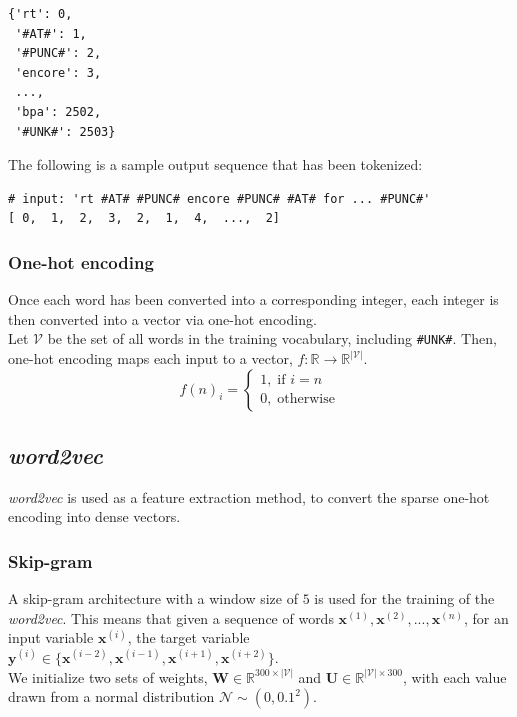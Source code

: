 \documentclass{article}
\begin{document}
\begin{verbatim}
{'rt': 0,
 '#AT#': 1,
 '#PUNC#': 2,
 'encore': 3,
 ...,
 'bpa': 2502,
 '#UNK#': 2503}
\end{verbatim}

The following is a sample output sequence that has been tokenized:
\begin{verbatim}
# input: 'rt #AT# #PUNC# encore #PUNC# #AT# for ... #PUNC#'
[ 0,  1,  2,  3,  2,  1,  4,  ...,  2]
\end{verbatim}

\subsubsection{One-hot encoding}
Once each word has been converted into a corresponding integer, each integer is then converted into a vector via one-hot encoding.\\

Let $\mathcal{V}$ be the set of all words in the training vocabulary, including \lstinline{#UNK#}. Then, one-hot encoding maps each input to a vector, $f: \mathbb{R} \rightarrow \mathbb{R}^{|\mathcal{V}|}$.
	$$ f(n)_i = \left\{\begin{matrix}
	1, \; \text{if } i=n\\ 
	0, \; \text{otherwise}
	\end{matrix}\right. $$

\subsection{\emph{word2vec}}
\emph{word2vec} is used as a feature extraction method, to convert the sparse one-hot encoding into dense vectors.

\subsubsection{Skip-gram}
A skip-gram architecture with a window size of $5$ is used for the training of the \emph{word2vec}. This means that given a sequence of words $\bm{x}^{(1)}, \bm{x}^{(2)}, ..., \bm{x}^{(n)}$, for an input variable $\bm{x}^{(i)}$, the target variable $\bm{y}^{(i)} \in \{\bm{x}^{(i-2)}, \bm{x}^{(i-1)}, \bm{x}^{(i+1)}, \bm{x}^{(i+2)}\}$.\\

We initialize two sets of weights, $\bm{W} \in \mathbb{R}^{300 \times |\mathcal{V}|}$ and $\bm{U} \in \mathbb{R}^{|\mathcal{V}| \times 300}$, with each value drawn from a normal distribution $\mathcal{N} \sim (0, 0.1^2)$.\\
\end{document}
